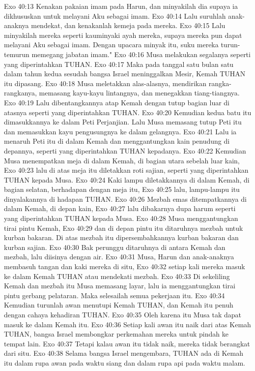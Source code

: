 Exo 40:13  Kenakan pakaian imam pada Harun, dan minyakilah dia supaya ia dikhususkan untuk melayani Aku sebagai imam.
Exo 40:14  Lalu suruhlah anak-anaknya mendekat, dan kenakanlah kemeja pada mereka.
Exo 40:15  Lalu minyakilah mereka seperti kauminyaki ayah mereka, supaya mereka pun dapat melayani Aku sebagai imam. Dengan upacara minyak itu, suku mereka turun-temurun memegang jabatan imam."
Exo 40:16  Musa melakukan segalanya seperti yang diperintahkan TUHAN.
Exo 40:17  Maka pada tanggal satu bulan satu dalam tahun kedua sesudah bangsa Israel meninggalkan Mesir, Kemah TUHAN itu dipasang.
Exo 40:18  Musa meletakkan alas-alasnya, mendirikan rangka-rangkanya, memasang kayu-kayu lintangnya, dan menegakkan tiang-tiangnya.
Exo 40:19  Lalu dibentangkannya atap Kemah dengan tutup bagian luar di atasnya seperti yang diperintahkan TUHAN.
Exo 40:20  Kemudian kedua batu itu dimasukkannya ke dalam Peti Perjanjian. Lalu Musa memasang tutup Peti itu dan memasukkan kayu pengusungnya ke dalam gelangnya.
Exo 40:21  Lalu ia menaruh Peti itu di dalam Kemah dan menggantungkan kain penudung di depannya, seperti yang diperintahkan TUHAN kepadanya.
Exo 40:22  Kemudian Musa menempatkan meja di dalam Kemah, di bagian utara sebelah luar kain,
Exo 40:23  lalu di atas meja itu diletakkan roti sajian, seperti yang diperintahkan TUHAN kepada Musa.
Exo 40:24  Kaki lampu diletakkannya di dalam Kemah, di bagian selatan, berhadapan dengan meja itu,
Exo 40:25  lalu, lampu-lampu itu dinyalakannya di hadapan TUHAN.
Exo 40:26  Mezbah emas ditempatkannya di dalam Kemah, di depan kain,
Exo 40:27  lalu dibakarnya dupa harum seperti yang diperintahkan TUHAN kepada Musa.
Exo 40:28  Musa menggantungkan tirai pintu Kemah,
Exo 40:29  dan di depan pintu itu ditaruhnya mezbah untuk kurban bakaran. Di atas mezbah itu dipersembahkannya kurban bakaran dan kurban sajian.
Exo 40:30  Bak perunggu ditaruhnya di antara Kemah dan mezbah, lalu diisinya dengan air.
Exo 40:31  Musa, Harun dan anak-anaknya membasuh tangan dan kaki mereka di situ,
Exo 40:32  setiap kali mereka masuk ke dalam Kemah TUHAN atau mendekati mezbah.
Exo 40:33  Di sekeliling Kemah dan mezbah itu Musa memasang layar, lalu ia menggantungkan tirai pintu gerbang pelataran. Maka selesailah semua pekerjaan itu.
Exo 40:34  Kemudian turunlah awan menutupi Kemah TUHAN, dan Kemah itu penuh dengan cahaya kehadiran TUHAN.
Exo 40:35  Oleh karena itu Musa tak dapat masuk ke dalam Kemah itu.
Exo 40:36  Setiap kali awan itu naik dari atas Kemah TUHAN, bangsa Israel membongkar perkemahan mereka untuk pindah ke tempat lain.
Exo 40:37  Tetapi kalau awan itu tidak naik, mereka tidak berangkat dari situ.
Exo 40:38  Selama bangsa Israel mengembara, TUHAN ada di Kemah itu dalam rupa awan pada waktu siang dan dalam rupa api pada waktu malam.


